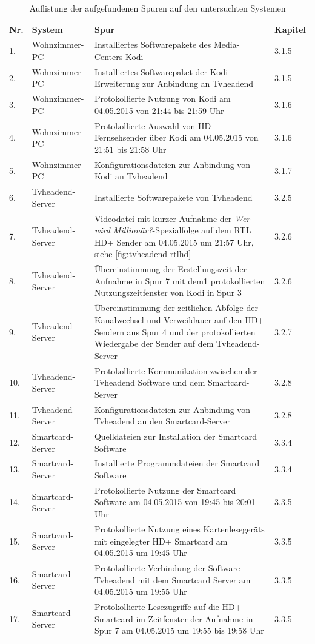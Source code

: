\begin{table}
\begin{tabular}{p{0.3cm}p{3cm}p{9cm}p{1.1cm}}
\hline 
Nr. & System & Spur & Kapitel \\ 
\hline
1. & Wohnzimmer-PC & Installiertes Softwarepakete des Media-Centers Kodi & 3.1.5 \\ 
\hline
2. & Wohnzimmer-PC & Installiertes Softwarepaket der Kodi Erweiterung zur Anbindung an Tvheadend & 3.1.5 \\ 
\hline
3. & Wohnzimmer-PC & Protokollierte Nutzung von Kodi am 04.05.2015 von 21:44 bis 21:59 Uhr & 3.1.6 \\ 
\hline
4. & Wohnzimmer-PC & Protokollierte Auswahl von HD+ Fernsehsender über Kodi am 04.05.2015 von 21:51 bis 21:58 Uhr & 3.1.6 \\ 
\hline
5. & Wohnzimmer-PC & Konfigurationsdateien zur Anbindung von Kodi an Tvheadend & 3.1.7 \\ 
\hline
6. & Tvheadend-Server & Installierte Softwarepakete von Tvheadend & 3.2.5 \\ 
\hline
7. & Tvheadend-Server & Videodatei mit kurzer Aufnahme der \textit{Wer wird Millionär?}-Spezialfolge auf dem RTL HD+ Sender am 04.05.2015 um 21:57 Uhr, siehe \autoref{fig:tvheadend-rtlhd} & 3.2.6 \\ 
\hline
8. & Tvheadend-Server & Übereinstimmung der Erstellungszeit der Aufnahme in Spur 7 mit dem1 protokollierten Nutzungszeitfenster von Kodi in Spur 3 & 3.2.6 \\ 
\hline
9. & Tvheadend-Server & Übereinstimmung der zeitlichen Abfolge der Kanalwechsel und Verweildauer auf den HD+ Sendern aus Spur 4 und der protokollierten Wiedergabe der Sender auf dem Tvheadend-Server & 3.2.7 \\ 
\hline
10. & Tvheadend-Server & Protokollierte Kommunikation zwischen der Tvheadend Software und dem Smartcard-Server & 3.2.8 \\ 
\hline
11. & Tvheadend-Server & Konfigurationsdateien zur Anbindung von Tvheadend an den Smartcard-Server & 3.2.8 \\ 
\hline
12. & Smartcard-Server & Quelldateien zur Installation der Smartcard Software & 3.3.4 \\ 
\hline
13. & Smartcard-Server & Installierte Programmdateien der Smartcard Software & 3.3.4 \\
\hline
14. & Smartcard-Server & Protokollierte Nutzung der Smartcard Software am 04.05.2015 von 19:45 bis 20:01 Uhr & 3.3.5 \\
\hline
15. & Smartcard-Server & Protokollierte Nutzung eines Kartenlesegeräts mit eingelegter HD+ Smartcard am 04.05.2015 um 19:45 Uhr & 3.3.5 \\
\hline
16. & Smartcard-Server & Protokollierte Verbindung der Software Tvheadend mit dem Smartcard Server am 04.05.2015 um 19:55 Uhr & 3.3.5 \\
\hline
17. & Smartcard-Server & Protokollierte Lesezugriffe auf die HD+ Smartcard im Zeitfenster der Aufnahme in Spur 7 am 04.05.2015 um 19:55 bis 19:58 Uhr & 3.3.5 \\
\hline
\end{tabular}
\caption{Auflistung der aufgefundenen Spuren auf den untersuchten Systemen}
\label{table:summary-traces}
\end{table}